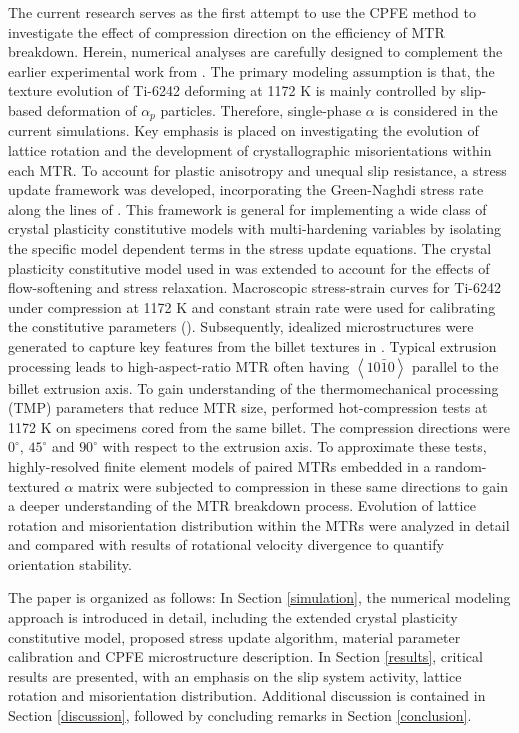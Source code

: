 \documentclass[review]{elsarticle}
\begin{document}
The current research serves as the first attempt to use the CPFE method to investigate the effect of compression direction on the efficiency of MTR breakdown.
Herein, numerical analyses are carefully designed to complement the earlier experimental work from \cite{r5,r26}.
The primary modeling assumption is that, the texture evolution of Ti-6242 deforming at 1172 K is mainly controlled by slip-based deformation of $\alpha _p$ particles.
Therefore, single-phase $\alpha$ is considered in the current simulations.
Key emphasis is placed on investigating the evolution of lattice rotation and the development of crystallographic misorientations within each MTR.
To account for plastic anisotropy and unequal slip resistance, a stress update framework was developed, incorporating the Green-Naghdi stress rate along the lines of \cite{r22}.
This framework is general for implementing a wide class of crystal plasticity constitutive models with multi-hardening variables by isolating the specific model dependent terms in the stress update equations.
The crystal plasticity constitutive model used in \cite{r18} was extended to account for the effects of flow-softening and stress relaxation.
Macroscopic stress-strain curves for Ti-6242 under compression at 1172 K and constant strain rate were used for calibrating the constitutive parameters (\cite{r26}).
Subsequently, idealized microstructures were generated to capture key features from the billet textures in \cite{r5}.
Typical extrusion processing leads to high-aspect-ratio MTR often having $\left< 10\bar{1}0 \right>$ parallel to the billet extrusion axis.
To gain understanding of the thermomechanical processing (TMP) parameters that reduce MTR size, \cite{r26} performed hot-compression tests at 1172 K on specimens cored from the same billet.
The compression directions were $0^{\circ}$, $45^{\circ}$ and $90^{\circ}$ with respect to the extrusion axis.
To approximate these tests, highly-resolved finite element models of paired MTRs embedded in a random-textured $\alpha$ matrix were subjected to compression in these same directions to gain a deeper understanding of the MTR breakdown process.
Evolution of lattice rotation and misorientation distribution within the MTRs were analyzed in detail and compared with results of rotational velocity divergence to quantify orientation stability.

The paper is organized as follows:
In Section \ref{simulation}, the numerical modeling approach is introduced in detail, including the extended crystal plasticity constitutive model, proposed stress update algorithm, material parameter calibration and CPFE microstructure description.
In Section \ref{results}, critical results are presented, with an emphasis on the slip system activity, lattice rotation and misorientation distribution.
Additional discussion is contained in Section \ref{discussion}, followed by concluding remarks in Section \ref{conclusion}.
\end{document}
